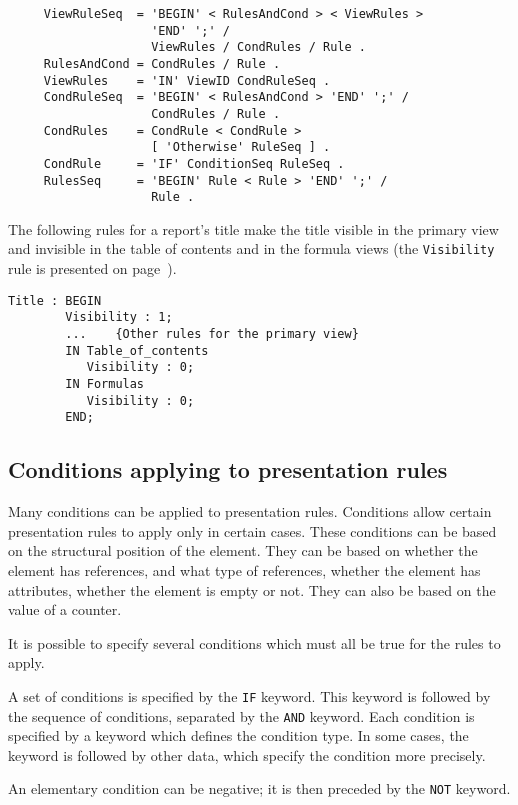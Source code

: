 \begin{verbatim}
     ViewRuleSeq  = 'BEGIN' < RulesAndCond > < ViewRules >
                    'END' ';' /
                    ViewRules / CondRules / Rule .
     RulesAndCond = CondRules / Rule .
     ViewRules    = 'IN' ViewID CondRuleSeq .
     CondRuleSeq  = 'BEGIN' < RulesAndCond > 'END' ';' /
                    CondRules / Rule .
     CondRules    = CondRule < CondRule >
                    [ 'Otherwise' RuleSeq ] .
     CondRule     = 'IF' ConditionSeq RuleSeq .
     RulesSeq     = 'BEGIN' Rule < Rule > 'END' ';' /
                    Rule .
\end{verbatim}

\begin{example}
The following rules for a report's title make the title visible in the
primary view and invisible in the table of contents and in the formula
views (the {\tt Visibility} rule is presented on page~\pageref{visib}).
\begin{verbatim}
Title : BEGIN
        Visibility : 1;
        ...    {Other rules for the primary view}
        IN Table_of_contents
           Visibility : 0;
        IN Formulas
           Visibility : 0;
        END;
\end{verbatim}
\end{example}

\subsection{Conditions applying to presentation rules}

Many conditions can be applied to presentation rules.  Conditions allow
certain presentation rules to apply only in certain cases.  These
conditions can be based on the structural position of the element.  They
can be based on whether the element has references, and what type
of references, whether the element has attributes, whether the element
is empty or not.  They can also be based on the value of a counter.

It is possible to specify several conditions which must
all be true for the rules to apply.

A set of conditions is specified by the {\tt IF} keyword.  This
keyword is followed by the sequence of conditions, separated by the
{\tt AND} keyword.  Each condition is specified by a keyword which
defines the condition type.  In some cases, the keyword is followed
by other data, which specify the condition more precisely.

An elementary condition can be
negative; it is then preceded by the {\tt NOT} keyword.

